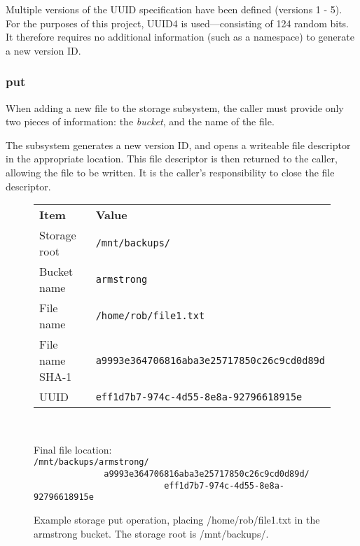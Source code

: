 Multiple versions of the UUID specification have been defined (versions 1 - 5).
For the purposes of this project, UUID4 is used---consisting of 124 random
bits. It therefore requires no additional information (such as a namespace) to
generate a new version ID.

\subsubsection{put}

When adding a new file to the storage subsystem, the caller must provide only
two pieces of information: the \emph{bucket}, and the name of the file.

The subsystem generates a new version ID, and opens a writeable file descriptor
in the appropriate location. This file descriptor is then returned to the
caller, allowing the file to be written. It is the caller's responsibility to
close the file descriptor.

\begin{figure}
    \begin{center}
        \begin{tabular}{l l}
            \textbf{Item}   & \textbf{Value}                                 \\
            Storage root    & \verb!/mnt/backups/!                           \\
            Bucket name     & \verb!armstrong!                               \\
            File name       & \verb!/home/rob/file1.txt!                     \\
            File name SHA-1 & \verb!a9993e364706816aba3e25717850c26c9cd0d89d!\\
            UUID            & \verb!eff1d7b7-974c-4d55-8e8a-92796618915e!    \\
        \end{tabular} \\
    \end{center}
        Final file location: \\
        \verb!/mnt/backups/armstrong/! \\
        \verb!              a9993e364706816aba3e25717850c26c9cd0d89d/! \\
        \verb!                          eff1d7b7-974c-4d55-8e8a-92796618915e!
    \caption{Example storage put operation, placing /home/rob/file1.txt in the
    armstrong bucket. The storage root is /mnt/backups/.}
    \label{fig:storage-put-example}
\end{figure}


